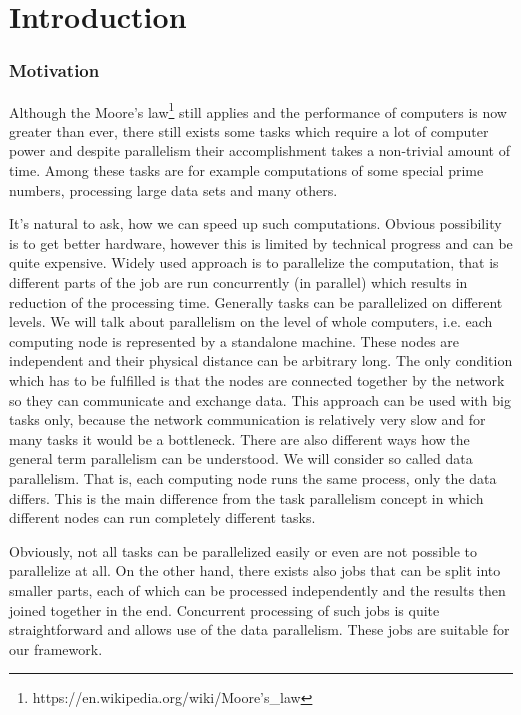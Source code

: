 \chapter*{Introduction}
\subsection*{Motivation}

Although the Moore's law\footnote{https://en.wikipedia.org/wiki/Moore's\_law} still applies and the performance of computers is now greater than ever, there still exists some tasks which require a lot of computer power and despite parallelism their accomplishment takes a non-trivial amount of time. Among these tasks are for example computations of some special prime numbers, processing large data sets and many others.

It's natural to ask, how we can speed up such computations. Obvious possibility is to get better hardware, however this is limited by technical progress and can be quite expensive. Widely used approach is to parallelize the computation, that is different parts of the job are run concurrently (in parallel) which results in reduction of the processing time. Generally tasks can be parallelized on different levels. We will talk about parallelism on the level of whole computers, i.e. each computing node is represented by a standalone machine. These nodes are independent and their physical distance can be arbitrary long. The only condition which has to be fulfilled is that the nodes are connected together by the network so they can communicate and exchange data. This approach can be used with big tasks only, because the network communication is relatively very slow and for many tasks it would be a bottleneck. There are also different ways how the general term parallelism can be understood. We will consider so called data parallelism. That is, each computing node runs the same process, only the data differs. This is the main difference from the task parallelism concept in which different nodes can run completely different tasks.

Obviously, not all tasks can be parallelized easily or even are not possible to parallelize at all. On the other hand, there exists also jobs that can be split into smaller parts, each of which can be processed independently and the results then joined together in the end. Concurrent processing of such jobs is quite straightforward and allows use of the data parallelism. These jobs are suitable for our framework.

